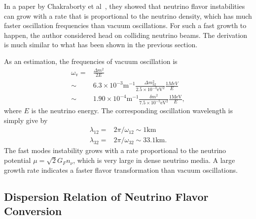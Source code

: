 In a paper by Chakraborty et al~\cite{Chakraborty2016}, they showed that neutrino flavor instabilities can grow with a rate that is proportional to the neutrino density, which has much faster oscillation frequencies than vacuum oscillations. For such a fast growth to happen, the author considered head on colliding neutrino beams. The derivation is much similar to what has been shown in the previous section.

As an estimation, the frequencies of vacuum oscillation is
\begin{align*}
   \omega_{\mathrm v} =& \frac{\Delta m^2}{2E} \\ \sim& 6.3\times 10^{-3} \mathrm{m}^{-1}  \frac{\Delta m^2_{32}}{2.5\times 10^{-3} \mathrm{eV}^2 } \frac{1MeV}{E} \\
   \sim & 1.90\times 10^{-4}  \mathrm{m}^{-1}  \frac{\delta m^2}{7.5\times 10^{-5}\mathrm{eV}^2} \frac{1\mathrm{MeV}}{E},
\end{align*}
where $E$ is the neutrino energy. The corresponding oscillation wavelength is simply give by
\begin{align*}
   \lambda_{12} = & 2\pi/\omega_{12} \sim 1 \mathrm{km}\\
   \lambda_{32} = & 2\pi/\omega_{32} \sim 33.1 \mathrm{km}.
\end{align*}
The fast modes instability grows with a rate proportional to the neutrino potential $\mu=\sqrt{2}G_F n_\nu$, which is very large in dense neutrino media. A large growth rate indicates a faster flavor transformation than vacuum oscillations.










\subsection{\label{chap:collective-sec:fast-mode-subsec:dr}Dispersion Relation of Neutrino Flavor Conversion}

